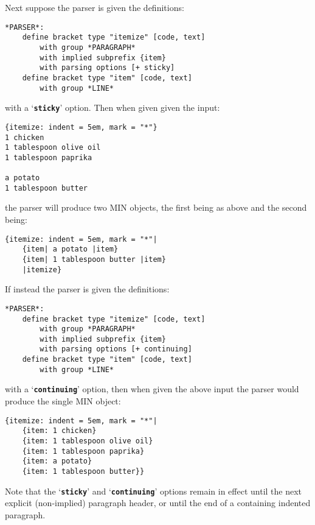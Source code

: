 \documentclass[12pt]{article}
\newcommand{\TT}[1]{{\tt \bfseries #1}}
\newenvironment{indpar}[1][0.3in]%
	{\begin{list}{}%
		     {\setlength{\itemsep}{0in}%
		      \setlength{\topsep}{0in}%
		      \setlength{\parsep}{1ex}%
		      \setlength{\labelwidth}{#1}%
		      \setlength{\leftmargin}{#1}%
		      \addtolength{\leftmargin}{\labelsep}}%
	 \item}%
	{\end{list}}
\begin{document}
Next suppose the parser is given the definitions:
\begin{indpar}\begin{verbatim}
*PARSER*:
    define bracket type "itemize" [code, text]
        with group *PARAGRAPH*
        with implied subprefix {item}
        with parsing options [+ sticky]
    define bracket type "item" [code, text]
        with group *LINE*
\end{verbatim}\end{indpar}
with a `\TT{sticky}' option.  Then when given given the input:
\begin{indpar}\begin{verbatim}
{itemize: indent = 5em, mark = "*"}
1 chicken
1 tablespoon olive oil
1 tablespoon paprika

a potato
1 tablespoon butter
\end{verbatim}\end{indpar}
the parser will produce two MIN objects, the first being as
above and the second being:
\begin{indpar}\begin{verbatim}
{itemize: indent = 5em, mark = "*"|
    {item| a potato |item}
    {item| 1 tablespoon butter |item}
    |itemize}
\end{verbatim}\end{indpar}

If instead the parser is given the definitions:
\begin{indpar}\begin{verbatim}
*PARSER*:
    define bracket type "itemize" [code, text]
        with group *PARAGRAPH*
        with implied subprefix {item}
        with parsing options [+ continuing]
    define bracket type "item" [code, text]
        with group *LINE*
\end{verbatim}\end{indpar}
with a `\TT{continuing}' option, then when given the above input
the parser would produce the single MIN object:
\begin{indpar}\begin{verbatim}
{itemize: indent = 5em, mark = "*"|
    {item: 1 chicken}
    {item: 1 tablespoon olive oil}
    {item: 1 tablespoon paprika}
    {item: a potato}
    {item: 1 tablespoon butter}}
\end{verbatim}\end{indpar}

Note that the `\TT{sticky}' and `\TT{continuing}' options
remain in effect until the next explicit (non-implied)
paragraph header, or until the end of a containing
indented paragraph.
\end{document}
